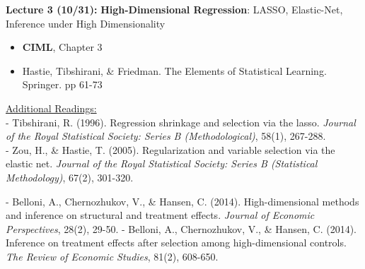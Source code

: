 \documentclass[12pt]{article}
\begin{document}
\vspace{2em}
\noindent\textbf{Lecture 3 (10/31): } \textbf{High-Dimensional
Regression}: LASSO, Elastic-Net, Inference under High Dimensionality  \\
\vspace{1em}
\begin{itemize}
    \item \textbf{CIML}, Chapter 3
    \item Hastie, Tibshirani, \& Friedman. The Elements of Statistical Learning. Springer. pp 61-73
\end{itemize}
\vspace{1em}
\underline{Additional Readings:} \\
\hspace{1em} - Tibshirani, R. (1996). Regression shrinkage and selection via the lasso. \textit{Journal of the Royal Statistical Society: Series B (Methodological)}, 58(1), 267-288. \\
\hspace{1em} - Zou, H., \& Hastie, T. (2005). Regularization and variable selection via the elastic net. \textit{Journal of the Royal Statistical Society: Series B (Statistical Methodology)}, 67(2), 301-320.

\hspace{1em} - Belloni, A., Chernozhukov, V., \& Hansen, C. (2014). High-dimensional methods and inference on structural and treatment effects. \textit{Journal of Economic Perspectives}, 28(2), 29-50.
\hspace{1em}   - Belloni, A., Chernozhukov, V., \& Hansen, C. (2014). Inference on treatment effects after selection among high-dimensional controls. \textit{The Review of Economic Studies}, 81(2), 608-650.
\end{document}
